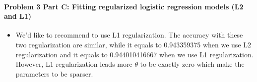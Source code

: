\documentclass[paper=a4, fontsize=11pt]{scrartcl} %
\numberwithin{equation}{section} %
\numberwithin{figure}{section} %
\numberwithin{table}{section} %
\begin{document}
\paragraph{\textbf{Problem 3 Part C: Fitting regularized logistic regression models (L2 and L1)}}
\begin{itemize}
	\item 
We'd like to recommend to use L1 regularization. The accuracy with these two regularization are similar, while it equals to 0.943359375 when we use L2 regularization and it equals to 0.944010416667 when we use L1 regularization. However, L1 regularization leads more $\theta$ to be exactly zero which make the parameters to be sparser.
\end{itemize}
\end{document}
